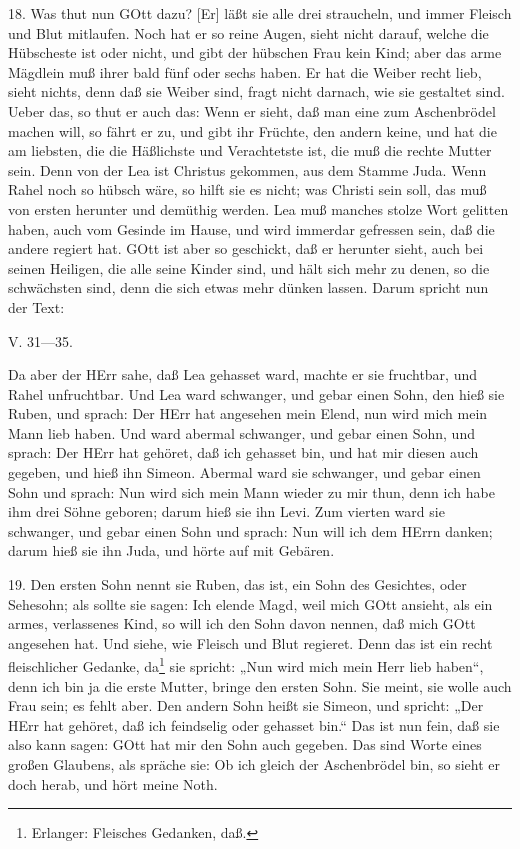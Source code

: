 18. Was thut nun GOtt dazu? [Er] läßt sie alle drei straucheln, und immer Fleisch und Blut mitlaufen. Noch hat er so reine Augen, sieht nicht darauf, welche die Hübscheste ist oder nicht, und gibt der hübschen Frau kein Kind; aber das arme Mägdlein muß ihrer bald fünf oder sechs haben. Er hat die Weiber recht lieb, sieht nichts, denn daß sie Weiber sind, fragt nicht darnach, wie sie gestaltet sind. Ueber das, so thut er auch das: Wenn er sieht, daß man eine zum Aschenbrödel machen will, so fährt er zu, und gibt ihr Früchte, den andern keine, und hat die am liebsten, die die Häßlichste und Verachtetste ist, die muß die rechte Mutter sein. Denn von der Lea ist Christus gekommen, aus dem Stamme Juda. Wenn Rahel noch so hübsch wäre, so hilft sie es nicht; was Christi sein soll, das muß von ersten herunter und demüthig werden. Lea muß manches stolze Wort gelitten haben, auch vom Gesinde im Hause, und wird immerdar gefressen sein, daß die andere regiert hat. GOtt ist aber so geschickt, daß er herunter sieht, auch bei seinen Heiligen, die alle seine Kinder sind, und hält sich mehr zu denen, so die schwächsten sind, denn die sich etwas mehr dünken lassen. Darum spricht nun der Text:
\begin{schriftzitat}
V. 31—35.

Da aber der HErr sahe, daß Lea gehasset ward, machte er sie fruchtbar, und Rahel unfruchtbar. Und Lea ward schwanger, und gebar einen Sohn, den hieß sie Ruben, und sprach: Der HErr hat angesehen mein Elend, nun wird mich mein Mann lieb haben. Und ward abermal schwanger, und gebar einen Sohn, und sprach: Der HErr hat gehöret, daß ich gehasset bin, und hat mir diesen auch gegeben, und hieß ihn Simeon. Abermal ward sie schwanger, und gebar einen Sohn und sprach: Nun wird sich mein Mann wieder zu mir thun, denn ich habe ihm drei Söhne geboren; darum hieß sie ihn Levi. Zum vierten ward sie schwanger, und gebar einen Sohn und sprach: Nun will ich dem HErrn danken; darum hieß sie ihn Juda, und hörte auf mit Gebären.
\end{schriftzitat}

19. Den ersten Sohn nennt sie Ruben, das ist, ein Sohn des Gesichtes, oder Sehesohn; als sollte sie sagen: Ich elende Magd, weil mich GOtt ansieht, als ein armes, verlassenes Kind, so will ich den Sohn davon nennen, daß mich GOtt angesehen hat. Und siehe, wie Fleisch und Blut regieret. Denn das ist ein recht fleischlicher Gedanke, da\footnote{Erlanger: Fleisches Gedanken, daß.} sie spricht: „Nun wird mich mein Herr lieb haben“, denn ich bin ja die erste Mutter, bringe den ersten Sohn. Sie meint, sie wolle auch Frau sein; es fehlt aber. Den andern Sohn heißt sie Simeon, und spricht: „Der HErr hat gehöret, daß ich feindselig oder gehasset bin.“ Das ist nun fein, daß sie also kann sagen: GOtt hat mir den Sohn auch gegeben. Das sind Worte eines großen Glaubens, als spräche sie: Ob ich gleich der Aschenbrödel bin, so sieht er doch herab, und hört meine Noth.

